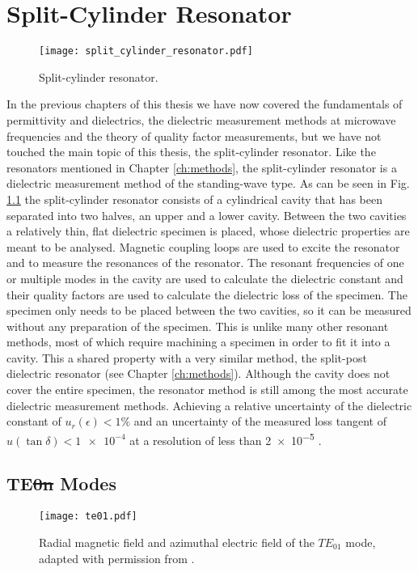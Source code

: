 \chapter{Split-Cylinder Resonator}\label{ch:splitc}
\begin{figure}
\centering
\texttt{[image: split\_cylinder\_resonator.pdf]}
\caption{Split-cylinder resonator.}\label{fig:split_cyl}
\end{figure}
In the previous chapters of this thesis we have now covered the fundamentals of permittivity and dielectrics, the dielectric measurement methods at microwave frequencies and the theory of quality factor measurements, but we have not touched the main topic of this thesis, the split-cylinder resonator. Like the resonators mentioned in Chapter \ref{ch:methods}, the split-cylinder resonator is a dielectric measurement method of the standing-wave type. As can be seen in Fig. \ref{fig:split_cyl} the split-cylinder resonator consists of a cylindrical cavity that has been separated into two halves, an upper and a lower cavity. Between the two cavities a relatively thin, flat dielectric specimen is placed, whose dielectric properties are meant to be analysed. Magnetic coupling loops are used to excite the resonator and to measure the resonances of the resonator. The resonant frequencies of one or multiple modes in the cavity are used to calculate the dielectric constant and their quality factors are used to calculate the dielectric loss of the specimen. The specimen only needs to be placed between the two cavities, so it can be measured without any preparation of the specimen. This is unlike many other resonant methods, most of which require machining a specimen in order to fit it into a cavity. This a shared property with a very similar method, the split-post dielectric resonator (see Chapter \ref{ch:methods}). Although the cavity does not cover the entire specimen, the resonator method is still among the most accurate dielectric measurement methods. Achieving a relative uncertainty of the dielectric constant of $u_r(\epsilon)<1\%$ and an uncertainty of the measured loss tangent of $u(\tan\delta )<\num{1e-4}$ at a resolution of less than \num{2e-5} \cite{keysightSC,janezic1999, chen}.

\section{\texorpdfstring{TE\st{0n}}{TE0n} Modes}
\begin{figure}
\centering
\texttt{[image: te01.pdf]}
\caption{Radial magnetic field and azimuthal electric field of the $TE_{01}$ mode, adapted with permission from \cite{ramo}.}\label{fig:fc_te}
\end{figure}

